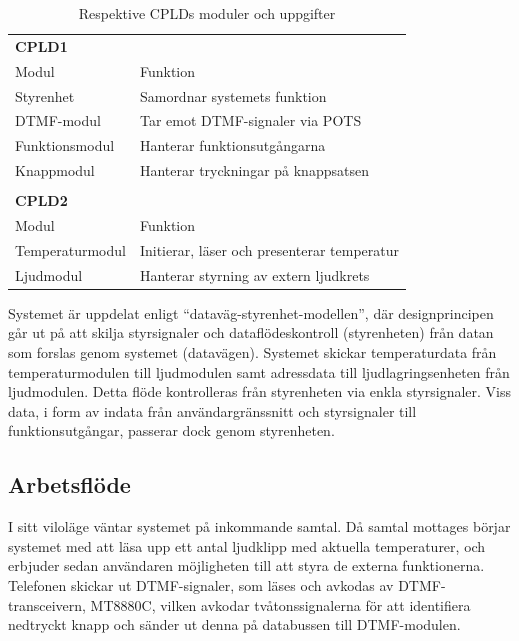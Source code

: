 \documentclass[a4paper,11pt]{article}
\begin{document}
	\begin{table} [H]
		
		\caption{Respektive CPLDs moduler och uppgifter} 
		\label{tab:uppdelningstabell}
	\begin{tabular}{l l}
		
		{\bf CPLD1} \\
		Modul	& Funktion	\\
		\hline
		Styrenhet	& Samordnar systemets funktion \\
		DTMF-modul & Tar emot DTMF-signaler via POTS \\
		Funktionsmodul	& Hanterar funktionsutgångarna \\
		Knappmodul	& Hanterar tryckningar på knappsatsen \\
		\\
		{\bf CPLD2} \\
		Modul	& Funktion	\\
		\hline
		Temperaturmodul	& Initierar, läser och presenterar temperatur \\
		Ljudmodul	& Hanterar styrning av extern ljudkrets \\
		
	\end{tabular}
	\end{table}
	
	Systemet är uppdelat enligt ``dataväg-styrenhet-modellen'', där designprincipen går ut på att skilja styrsignaler
	och dataflödeskontroll (styrenheten) från datan som forslas genom systemet (datavägen). Systemet skickar temperaturdata från temperaturmodulen till ljudmodulen samt adressdata till ljudlagringsenheten från ljudmodulen. Detta flöde kontrolleras från styrenheten via
	enkla styrsignaler. Viss data, i form av indata från användargränssnitt och styrsignaler till funktionsutgångar, passerar dock genom styrenheten.

	\subsection{Arbetsflöde}

I sitt viloläge väntar systemet på inkommande samtal. Då samtal mottages börjar systemet med att läsa upp ett antal ljudklipp med aktuella temperaturer, och erbjuder sedan användaren möjligheten till att styra de externa funktionerna. Telefonen skickar ut DTMF-signaler, som läses och avkodas av DTMF-transceivern, MT8880C, vilken avkodar tvåtonssignalerna för att identifiera nedtryckt knapp och sänder ut denna på databussen till DTMF-modulen. 
\end{document}
